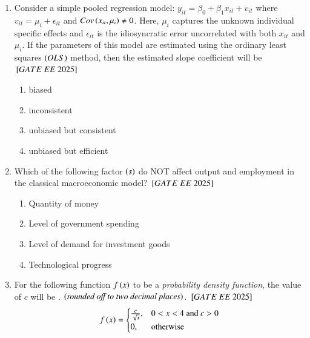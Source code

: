 \documentclass[journal,12pt,onecolumn]{IEEEtran}
\theoremstyle{remark}
\begin{document}
\begin{enumerate}
\item Consider a simple pooled regression model: $y_{it} = \beta_0 + \beta_1 x_{it} + v_{it}$ where $v_{it} = \mu_i + \epsilon_{it}$ and $Cov \left(x_{it},\mu_{i}\right) \neq 0$. Here, $\mu_{i}$ captures the unknown individual specific effects and $\epsilon_{it}$ is the idiosyncratic error uncorrelated with both $x_{it}$ and $\mu_{i}$. If the parameters of this model are estimated using the ordinary least squares  $\left(OLS\right)$ method, then the estimated slope coefficient will be
$\sbrak{GATE\ EE\ 2025}$\\
    \begin{enumerate}[label=(\Alph*)]
    \item biased
    \item inconsistent
    \item unbiased but consistent
    \item unbiased but efficient
    \end{enumerate}
 
\item Which of the following factor $\left(s\right)$ do NOT affect output and employment in the classical macroeconomic model?
$\sbrak{GATE\ EE\ 2025}$\\
    \begin{enumerate}[label=(\Alph*)]
    \item Quantity of money
    \item Level of government spending
    \item Level of demand for investment goods
    \item Technological progress
    \end{enumerate}
 
\item For the following function $f \left(x\right)$ to be a \textit{probability density function}, the value of $c$ will be \underline{\hspace{2cm}}.  $\left(\textit{rounded off to two decimal places}\right)$.
$\sbrak{GATE\ EE\ 2025}$\\
\[
f \left(x\right) =
  \begin{cases}
    \frac{c}{\sqrt{x}}, & 0 < x < 4\text{ and } c > 0 \\
    0, & \text{otherwise}
  \end{cases}
\]
 

\end{enumerate}
\end{document}
